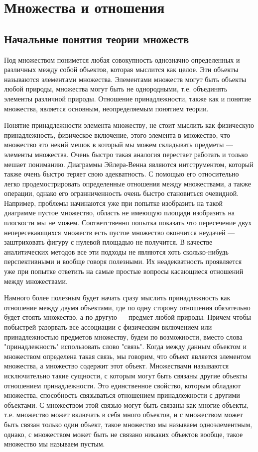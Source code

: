 \documentclass[letterpaper, 10pt]{article}
\theoremstyle{definition}
\begin{document}
\section{Множества и отношения}

\subsection{Начальные понятия теории множеств}

Под множеством понимется любая совокупность однозначно определенных и различных
между собой объектов, которая мыслится как целое. Эти объекты называются
элементами множества. Элементами множеств могут быть объекты любой природы,
множества могут быть не однородными, т.е. объединять элементы различной природы.
Отношение принадлежности, также как и понятие множества, является основным,
неопределяемым понятием теории.

Понятие принадлежности элемента множеству, не стоит мыслить как физическую
принадлежность, физическое включение, этого элемента в множество, что множество
это некий мешок в который мы можем складывать предметы --- элементы множества.
Очень быстро такая аналогия перестает работать и только мешает пониманию.
Диаграммы Эйлера-Венна являются интструментом, который также очень быстро теряет
свою адекватность. С помощью его относительно легко продемострировать
определенные отношения между множествами, а также операции, однако его
огранниченность очень быстро становиться очевидной. Например, проблемы
начинаются уже при попытке изобразить на такой диаграмме пустое множество,
область не имеющую площади изобразить на плоскости мы не можем. Соответственно
попытка показать что пересечение двух непересекающихся множеств есть пустое
множество окончится неудачей --- заштриховать фигуру с нулевой площадью не
получится. В качестве аналитических методов все эти подходы не являются хоть
сколько-нибудь перспективными и вообще говоря полезными. Их неадекватность
проявляется уже при попытке ответить на самые простые вопросы касающиеся
отношений между множествами.

Намного более полезным будет начать сразу мыслить принадлежность как отношение
между двумя объектами, где по одну сторону отношения обязательно будет стоять
множество, а по другую --- предмет любой природы. Причем чтобы побыстрей
разорвать все ассоциации с физическим включением или принадлежностью предметов
множеству, будем по возможности, вместо слова "принадлежность" использовать
слово "связь". Когда между данным объектом и множеством определена такая связь,
мы говорим, что объект является элементом множества, а множество содержит этот
объект. Множествами называются исключительно такие сущности, с которым могут
быть связаны другие объекты отношением принадлежности. Это единственное
свойство, которым обладают множества, способность связываться отношением
принадлежности с другими объектами. С множеством этой связью могут быть связаны
как многие объекты, т.е.  множество может включать в себя много объектов, и с
множеством может быть связан только один объект, такое множество мы называем
одноэлементным, однако, с множеством может быть не связано никаких объектов
вообще, такое множество мы называем пустым. 
\end{document}
